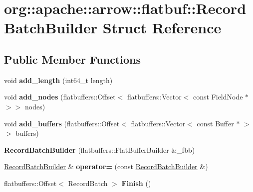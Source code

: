 \hypertarget{structorg_1_1apache_1_1arrow_1_1flatbuf_1_1RecordBatchBuilder}{}\section{org\+:\+:apache\+:\+:arrow\+:\+:flatbuf\+:\+:Record\+Batch\+Builder Struct Reference}
\label{structorg_1_1apache_1_1arrow_1_1flatbuf_1_1RecordBatchBuilder}
\subsection*{Public Member Functions}
\begin{DoxyCompactItemize}
\item 
void {\bfseries add\+\_\+length} (int64\+\_\+t length)\hypertarget{structorg_1_1apache_1_1arrow_1_1flatbuf_1_1RecordBatchBuilder_a6004c923497613dae69500530b56e9ef}{}\label{structorg_1_1apache_1_1arrow_1_1flatbuf_1_1RecordBatchBuilder_a6004c923497613dae69500530b56e9ef}

\item 
void {\bfseries add\+\_\+nodes} (flatbuffers\+::\+Offset$<$ flatbuffers\+::\+Vector$<$ const Field\+Node $\ast$ $>$$>$ nodes)\hypertarget{structorg_1_1apache_1_1arrow_1_1flatbuf_1_1RecordBatchBuilder_ade9abd3c9e5528016d81de96aa37548f}{}\label{structorg_1_1apache_1_1arrow_1_1flatbuf_1_1RecordBatchBuilder_ade9abd3c9e5528016d81de96aa37548f}

\item 
void {\bfseries add\+\_\+buffers} (flatbuffers\+::\+Offset$<$ flatbuffers\+::\+Vector$<$ const Buffer $\ast$ $>$$>$ buffers)\hypertarget{structorg_1_1apache_1_1arrow_1_1flatbuf_1_1RecordBatchBuilder_a497695b21eeef193cfa86442706d2d48}{}\label{structorg_1_1apache_1_1arrow_1_1flatbuf_1_1RecordBatchBuilder_a497695b21eeef193cfa86442706d2d48}

\item 
{\bfseries Record\+Batch\+Builder} (flatbuffers\+::\+Flat\+Buffer\+Builder \&\+\_\+fbb)\hypertarget{structorg_1_1apache_1_1arrow_1_1flatbuf_1_1RecordBatchBuilder_afe3c7407271178e6c6e38caa1fb05aac}{}\label{structorg_1_1apache_1_1arrow_1_1flatbuf_1_1RecordBatchBuilder_afe3c7407271178e6c6e38caa1fb05aac}

\item 
\hyperlink{structorg_1_1apache_1_1arrow_1_1flatbuf_1_1RecordBatchBuilder}{Record\+Batch\+Builder} \& {\bfseries operator=} (const \hyperlink{structorg_1_1apache_1_1arrow_1_1flatbuf_1_1RecordBatchBuilder}{Record\+Batch\+Builder} \&)\hypertarget{structorg_1_1apache_1_1arrow_1_1flatbuf_1_1RecordBatchBuilder_a41d522c35b865c878274097c6743f9d9}{}\label{structorg_1_1apache_1_1arrow_1_1flatbuf_1_1RecordBatchBuilder_a41d522c35b865c878274097c6743f9d9}

\item 
flatbuffers\+::\+Offset$<$ Record\+Batch $>$ {\bfseries Finish} ()\hypertarget{structorg_1_1apache_1_1arrow_1_1flatbuf_1_1RecordBatchBuilder_a1e507c8eee67a1a1c0b3b9dde0610d88}{}\label{structorg_1_1apache_1_1arrow_1_1flatbuf_1_1RecordBatchBuilder_a1e507c8eee67a1a1c0b3b9dde0610d88}

\end{DoxyCompactItemize}

